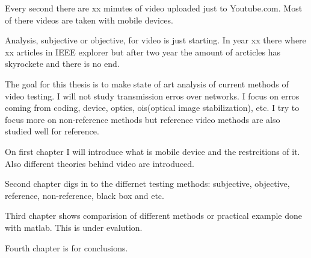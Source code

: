 
Every second there are xx minutes of video uploaded just to Youtube.com. Most
of there videos are taken with mobile devices. 

Analysis, subjective or objective, for video is just starting. In year xx
there where xx articles in IEEE explorer but after two year the amount of
arcticles has skyrockete and there is no end. 

The goal for this thesis is to make state of art analysis of current methods
of video testing. I will not study transmission erros over networks. I focus 
on erros coming from coding, device, optics,
ois(optical image stabilization), etc. I try to focus more on non-reference
methods but reference video methods are also studied well for reference. 

On first chapter I will introduce what is mobile device and the restrcitions
of it. Also different theories behind video are introduced. 

Second chapter digs in to the differnet testing methods: 
subjective, objective, reference, non-reference, black box and etc. 

Third chapter shows comparision of different methods or practical example
done with matlab. This is under evalution. 

Fourth chapter is for conclusions. 
